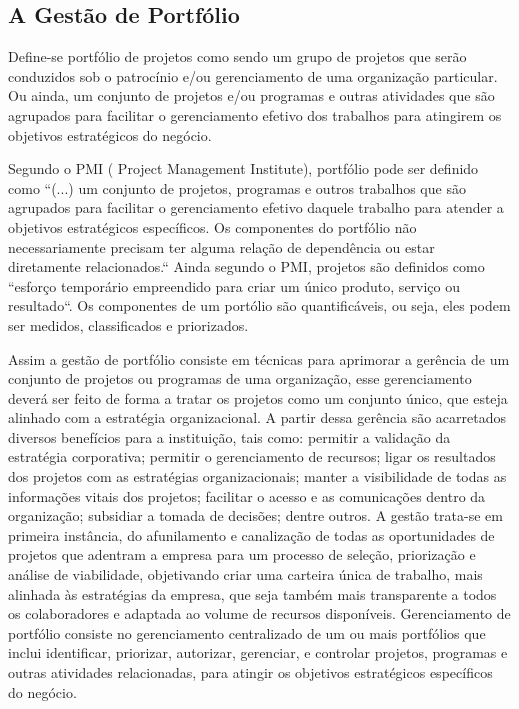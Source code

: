 \documentclass[a4paper,10pt]{article}
\begin{document}
\subsection{A Gestão de Portfólio}
\flushleft
Define-se portfólio de projetos como sendo um grupo de projetos que serão conduzidos sob o patrocínio e/ou gerenciamento de uma organização particular.  
Ou ainda, um conjunto de projetos e/ou programas e outras atividades que são agrupados para facilitar o gerenciamento efetivo dos trabalhos para atingirem
os objetivos estratégicos do negócio.

\flushleft
Segundo o PMI ( Project Management Institute), portfólio pode ser definido como ``(...) um conjunto de projetos, programas e outros trabalhos que são agrupados para facilitar o gerenciamento efetivo daquele
trabalho para atender a objetivos estratégicos específicos. Os componentes do portfólio não necessariamente precisam ter alguma relação de dependência ou estar diretamente relacionados.``
Ainda segundo o PMI, projetos são definidos como ``esforço temporário empreendido para criar um único produto, serviço ou resultado``.
Os componentes de um portólio são quantificáveis, ou seja, eles podem ser medidos, classificados e priorizados.\cite{sppm}


\flushleft
Assim a gestão de portfólio consiste em técnicas para aprimorar a gerência de um conjunto de projetos ou programas de uma organização, esse gerenciamento
deverá ser feito de forma a tratar os projetos como um conjunto único, que esteja alinhado com a estratégia organizacional. A partir dessa gerência são acarretados diversos 
benefícios para a instituição, tais como: permitir a validação da estratégia corporativa; permitir o gerenciamento de recursos; ligar os resultados dos projetos com as estratégias organizacionais; manter a visibilidade de todas as informações vitais dos projetos; 
facilitar o acesso e as comunicações dentro da organização; subsidiar a tomada de decisões; dentre outros. A gestão trata-se em primeira instância, do afunilamento e canalização de todas as oportunidades de projetos que adentram a empresa para um processo de seleção, 
priorização e análise de viabilidade, objetivando criar uma carteira única de trabalho, mais alinhada às estratégias da empresa, que seja também mais transparente a todos os colaboradores e adaptada ao volume de recursos disponíveis.
Gerenciamento de portfólio consiste no gerenciamento centralizado de um ou mais portfólios  que inclui identificar, priorizar, autorizar, gerenciar, e controlar projetos, programas e outras atividades relacionadas, para atingir os objetivos estratégicos específicos do negócio.\cite{mps}
\end{document}
